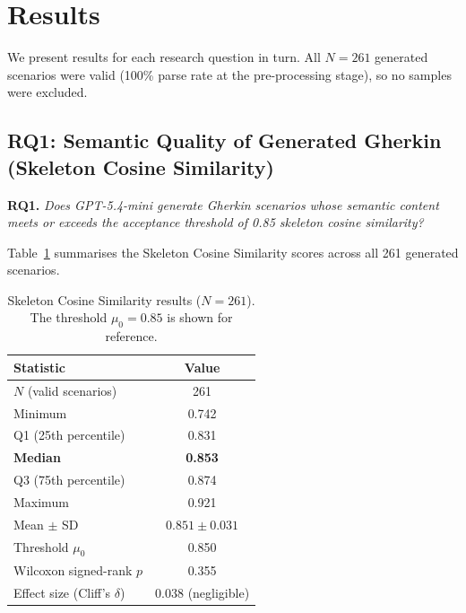 
\section{Results}
\label{sec:results}

We present results for each research question in turn.
All $N = 261$ generated scenarios were valid (100\% parse rate at the pre-processing stage),
so no samples were excluded.

\subsection{RQ1: Semantic Quality of Generated Gherkin (Skeleton Cosine Similarity)}

\textbf{RQ1.} \textit{Does GPT-5.4-mini generate Gherkin scenarios whose semantic content
meets or exceeds the acceptance threshold of 0.85 skeleton cosine similarity?}

Table~\ref{tab:rq1-results} summarises the Skeleton Cosine Similarity scores across all
261 generated scenarios.

\begin{table}[h]
\centering
\caption{Skeleton Cosine Similarity results ($N = 261$).
The threshold $\mu_0 = 0.85$ is shown for reference.}
\label{tab:rq1-results}
\renewcommand{\arraystretch}{1.3}
\begin{tabular}{lc}
\toprule
\textbf{Statistic} & \textbf{Value} \\
\midrule
$N$ (valid scenarios)      & 261   \\
Minimum                    & 0.742 \\
Q1 (25th percentile)       & 0.831 \\
\textbf{Median}            & \textbf{0.853} \\
Q3 (75th percentile)       & 0.874 \\
Maximum                    & 0.921 \\
Mean $\pm$ SD              & $0.851 \pm 0.031$ \\
Threshold $\mu_0$          & 0.850 \\
\midrule
Wilcoxon signed-rank $p$   & 0.355 \\
Effect size (Cliff's $\delta$) & 0.038 (negligible) \\
\bottomrule
\end{tabular}
\end{table}

